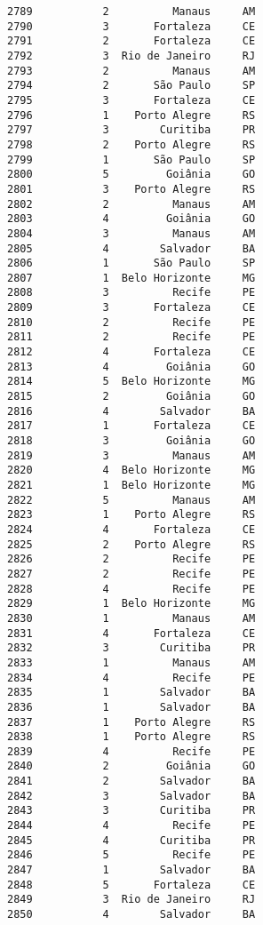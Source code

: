 \documentclass[11pt]{article}
\begin{document}
\begin{Verbatim}[commandchars=\\\{\}]
2789           2          Manaus     AM  
2790           3       Fortaleza     CE  
2791           2       Fortaleza     CE  
2792           3  Rio de Janeiro     RJ  
2793           2          Manaus     AM  
2794           2       São Paulo     SP  
2795           3       Fortaleza     CE  
2796           1    Porto Alegre     RS  
2797           3        Curitiba     PR  
2798           2    Porto Alegre     RS  
2799           1       São Paulo     SP  
2800           5         Goiânia     GO  
2801           3    Porto Alegre     RS  
2802           2          Manaus     AM  
2803           4         Goiânia     GO  
2804           3          Manaus     AM  
2805           4        Salvador     BA  
2806           1       São Paulo     SP  
2807           1  Belo Horizonte     MG  
2808           3          Recife     PE  
2809           3       Fortaleza     CE  
2810           2          Recife     PE  
2811           2          Recife     PE  
2812           4       Fortaleza     CE  
2813           4         Goiânia     GO  
2814           5  Belo Horizonte     MG  
2815           2         Goiânia     GO  
2816           4        Salvador     BA  
2817           1       Fortaleza     CE  
2818           3         Goiânia     GO  
2819           3          Manaus     AM  
2820           4  Belo Horizonte     MG  
2821           1  Belo Horizonte     MG  
2822           5          Manaus     AM  
2823           1    Porto Alegre     RS  
2824           4       Fortaleza     CE  
2825           2    Porto Alegre     RS  
2826           2          Recife     PE  
2827           2          Recife     PE  
2828           4          Recife     PE  
2829           1  Belo Horizonte     MG  
2830           1          Manaus     AM  
2831           4       Fortaleza     CE  
2832           3        Curitiba     PR  
2833           1          Manaus     AM  
2834           4          Recife     PE  
2835           1        Salvador     BA  
2836           1        Salvador     BA  
2837           1    Porto Alegre     RS  
2838           1    Porto Alegre     RS  
2839           4          Recife     PE  
2840           2         Goiânia     GO  
2841           2        Salvador     BA  
2842           3        Salvador     BA  
2843           3        Curitiba     PR  
2844           4          Recife     PE  
2845           4        Curitiba     PR  
2846           5          Recife     PE  
2847           1        Salvador     BA  
2848           5       Fortaleza     CE  
2849           3  Rio de Janeiro     RJ  
2850           4        Salvador     BA  

\end{Verbatim}
\end{document}

